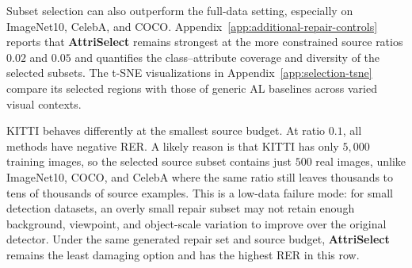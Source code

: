 \documentclass[10pt,twocolumn,letterpaper]{article}
\newcommand{\modelname}{AttriSelect}
\newcommand{\model}{\textcolor{darkteal}{\textbf{\modelname}}\xspace}
\begin{document}
Subset selection can also outperform the full-data setting, especially on ImageNet10, CelebA, and COCO. Appendix~\ref{app:additional-repair-controls} reports that \model remains strongest at the more constrained source ratios $0.02$ and $0.05$ and quantifies the class--attribute coverage and diversity of the selected subsets. The t-SNE visualizations in Appendix~\ref{app:selection-tsne} compare its selected regions with those of generic AL baselines across varied visual contexts.

KITTI behaves differently at the smallest source budget. At ratio $0.1$, all methods have negative RER. A likely reason is that KITTI has only $5{,}000$ training images, so the selected source subset contains just $500$ real images, unlike ImageNet10, COCO, and CelebA where the same ratio still leaves thousands to tens of thousands of source examples. This is a low-data failure mode: for small detection datasets, an overly small repair subset may not retain enough background, viewpoint, and object-scale variation to improve over the original detector. Under the same generated repair set and source budget, \model remains the least damaging option and has the highest RER in this row.
\end{document}
